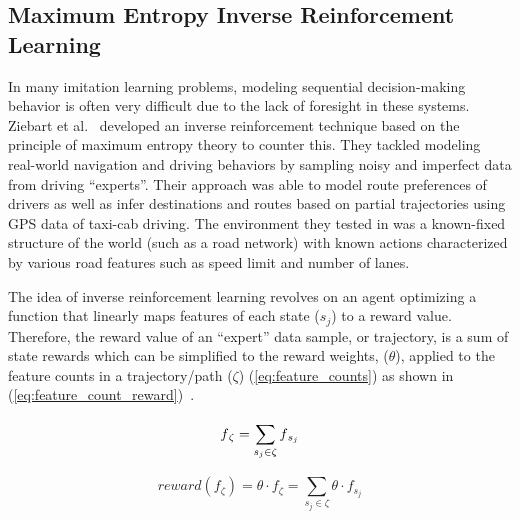 \documentclass[12pt,american]{report}
\begin{document}
\subsection{Maximum Entropy Inverse Reinforcement Learning}
\label{sec:maxentirl}
In many imitation learning problems, modeling sequential decision-making behavior is often very difficult due to the lack of foresight in these systems. Ziebart et al.~\cite{ziebart2008maximum} developed an inverse reinforcement technique based on the principle of maximum entropy theory to counter this.  They tackled modeling real-world navigation and driving behaviors by sampling noisy and imperfect data from driving ``experts''.  Their approach was able to model route preferences of drivers as well as infer destinations and routes based on partial trajectories using GPS data of taxi-cab driving.  The environment they tested in was a known-fixed structure of the world (such as a road network) with known actions characterized by various road features such as speed limit and number of lanes.

The idea of inverse reinforcement learning revolves on an agent optimizing a function that linearly maps features of each state (\textit{$s_j$}) to a reward value. Therefore, the reward value of an ``expert'' data sample, or trajectory, is a sum of state rewards which can be simplified to the reward weights, (\textit{$\theta$}), applied to the feature counts in a trajectory/path ($\zeta$) (\ref{eq:feature_counts}) as shown in (\ref{eq:feature_count_reward})~\cite{ziebart2008maximum}. 

\begin{equation}
            \label{eq:feature_counts}
            f\textsubscript{$\zeta$}= \sum_{s_j\in\zeta}^{}f\textsubscript{$s_j$}%
        \end{equation}

\begin{equation}
            \label{eq:feature_count_reward}
		 reward(f_{\zeta})=\theta \cdot f_{\zeta} = \sum_{s_j \in \zeta}^{} \theta \cdot f_{s_j}
        \end{equation}
\end{document}
